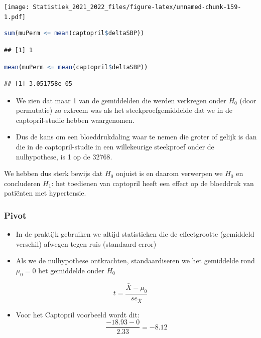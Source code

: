 \documentclass[
  12pt,dutch,coursenotes]{book}
\providecommand{\tightlist}{%
  \setlength{\itemsep}{0pt}\setlength{\parskip}{0pt}}
\theoremstyle{definition}
\theoremstyle{definition}
\theoremstyle{definition}
\theoremstyle{definition}
\theoremstyle{remark}
\begin{document}
\texttt{[image: Statistiek\_2021\_2022\_files/figure-latex/unnamed-chunk-159-1.pdf]}

\begin{lstlisting}[language=R]
sum(muPerm <= mean(captopril$deltaSBP))
\end{lstlisting}

\begin{lstlisting}
## [1] 1
\end{lstlisting}

\begin{lstlisting}[language=R]
mean(muPerm <= mean(captopril$deltaSBP))
\end{lstlisting}

\begin{lstlisting}
## [1] 3.051758e-05
\end{lstlisting}

\begin{itemize}
\item
  We zien dat maar 1 van de gemiddelden die werden verkregen onder \(H_0\) (door permutatie) zo extreem was als het steekproefgemiddelde dat we in de captopril-studie hebben waargenomen.
\item
  Dus de kans om een bloeddrukdaling waar te nemen die groter of gelijk is dan die in de captopril-studie in een willekeurige steekproef onder de nulhypothese, is 1 op de 32768.
\end{itemize}

We hebben dus sterk bewijs dat \(H_0\) onjuist is en daarom verwerpen we \(H_0\) en concluderen \(H_1\): het toedienen van captopril heeft een effect op de bloeddruk van patiënten met hypertensie.

\hypertarget{pivot}{%
\subsubsection{Pivot}\label{pivot}}

\begin{itemize}
\item
  In de praktijk gebruiken we altijd statistieken die de effectgrootte (gemiddeld verschil) afwegen tegen ruis (standaard error)
\item
  Als we de nulhypothese ontkrachten, standaardiseren we het gemiddelde rond \(\mu_0 = 0\) het gemiddelde onder \(H_0\)
\end{itemize}

\[t=\frac{\bar X-\mu_0}{se_{\bar X}}\]

\begin{itemize}
\tightlist
\item
  Voor het Captopril voorbeeld wordt dit:
  \[\frac{-18.93-0}{2.33}=-8.12\]
\end{itemize}
\end{document}
